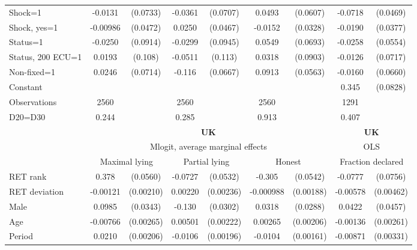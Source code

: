 \begin{tabular}{l|cccccc|cc}
Shock=1         &  -0.0131         & (0.0733)&  -0.0361         & (0.0707)&   0.0493         & (0.0607)&  -0.0718         & (0.0469)\\
Shock, yes=1    & -0.00986         & (0.0472)&   0.0250         & (0.0467)&  -0.0152         & (0.0328)&  -0.0190         & (0.0377)\\
Status=1        &  -0.0250         & (0.0914)&  -0.0299         & (0.0945)&   0.0549         & (0.0693)&  -0.0258         & (0.0554)\\
Status, 200 ECU=1&   0.0193         &  (0.108)&  -0.0511         &  (0.113)&   0.0318         & (0.0903)&  -0.0126         & (0.0717)\\
Non-fixed=1     &   0.0246         & (0.0714)&   -0.116\sym{*}  & (0.0667)&   0.0913         & (0.0563)&  -0.0160         & (0.0660)\\
Constant        &                  &         &                  &         &                  &         &    0.345\sym{***}& (0.0828)\\
\hline
Observations    &     2560         &         &     2560         &         &     2560         &         &     1291         &         \\
D20=D30         &    0.244         &         &    0.285         &         &    0.913         &         &    0.407         &         \\
\hline\hline
&\multicolumn{6}{c|}{\bf UK}&\multicolumn{2}{c}{\bf UK}\\ &\multicolumn{6}{c|}{Mlogit, average marginal effects }&\multicolumn{2}{c}{OLS}\\
                &\multicolumn{2}{c}{Maximal lying}&\multicolumn{2}{c}{Partial lying}&\multicolumn{2}{c}{Honest}  &\multicolumn{2}{c}{Fraction declared}\\
\hline
RET rank        &    0.378\sym{***}& (0.0560)&  -0.0727         & (0.0532)&   -0.305\sym{***}& (0.0542)&  -0.0777         & (0.0756)\\
RET deviation   & -0.00121         &(0.00210)&  0.00220         &(0.00236)&-0.000988         &(0.00188)& -0.00578         &(0.00462)\\
Male            &   0.0985\sym{***}& (0.0343)&   -0.130\sym{***}& (0.0302)&   0.0318         & (0.0288)&   0.0422         & (0.0457)\\
Age             & -0.00766\sym{***}&(0.00265)&  0.00501\sym{**} &(0.00222)&  0.00265         &(0.00206)& -0.00136         &(0.00261)\\
Period          &   0.0210\sym{***}&(0.00206)&  -0.0106\sym{***}&(0.00196)&  -0.0104\sym{***}&(0.00161)& -0.00871\sym{***}&(0.00331)\\

\end{tabular}
